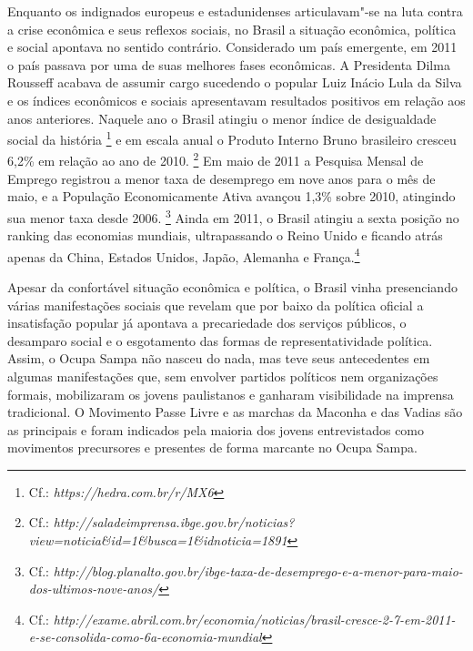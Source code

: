Enquanto os indignados europeus e estadunidenses articulavam"-se na luta
contra a crise econômica e seus reflexos sociais, no Brasil a situação
econômica, política e social apontava no sentido contrário. Considerado
um país emergente, em 2011 o país passava por uma de suas melhores fases
econômicas. A Presidenta Dilma Rousseff acabava de assumir cargo
sucedendo o popular Luiz Inácio Lula da Silva e os índices econômicos e
sociais apresentavam resultados positivos em relação aos anos
anteriores. Naquele ano o Brasil atingiu o menor índice de desigualdade
social da história \footnote{Cf.:
  \emph{https://hedra.com.br/r/MX6}}
e em escala anual o Produto Interno Bruno brasileiro cresceu 6,2\% em
relação ao ano de 2010. \footnote{Cf.:
  \emph{http://saladeimprensa.ibge.gov.br/noticias?view=noticia\&id=1\&busca=1\&idnoticia=1891}}%
Em maio de 2011 a Pesquisa Mensal de Emprego registrou a menor taxa de
desemprego em nove anos para o mês de maio, e a População Economicamente
Ativa avançou 1,3\% sobre 2010, atingindo sua menor taxa desde 2006.
\footnote{Cf.:
  \emph{http://blog.planalto.gov.br/ibge-taxa-de-desemprego-e-a-menor-para-maio-dos-ultimos-nove-anos/}}
Ainda em 2011, o Brasil atingiu a sexta posição no ranking das economias
mundiais, ultrapassando o Reino Unido e ficando atrás apenas da China,
Estados Unidos, Japão, Alemanha e França.\footnote{Cf.:
  \emph{http://exame.abril.com.br/economia/noticias/brasil-cresce-2-7-em-2011-e-se-consolida-como-6a-economia-mundial}}

Apesar da confortável situação econômica e política, o Brasil vinha
presenciando várias manifestações sociais que revelam que por baixo da
política oficial a insatisfação popular já apontava a precariedade dos
serviços públicos, o desamparo social e o esgotamento das formas de
representatividade política. Assim, o Ocupa Sampa não nasceu do nada,
mas teve seus antecedentes em algumas manifestações que, sem envolver
partidos políticos nem organizações formais, mobilizaram os jovens
paulistanos e ganharam visibilidade na imprensa tradicional. O Movimento
Passe Livre e as marchas da Maconha e das Vadias são as principais e
foram indicados pela maioria dos jovens entrevistados como movimentos
precursores e presentes de forma marcante no Ocupa Sampa.

